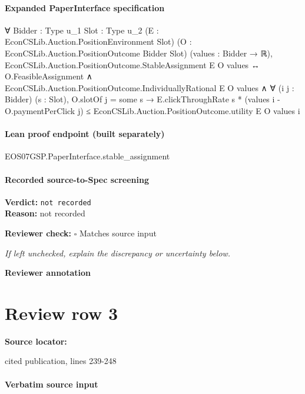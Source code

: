 \documentclass[10pt]{article}
\newcommand{\reviewerbox}{%
  \par\noindent\fbox{\parbox{0.96\linewidth}{\rule{0pt}{0.38in}}}\par
}
\newcommand{\reviewmatch}[1]{%
  \par\noindent\textbf{Reviewer check:} $\square$\; #1\par
  \noindent\emph{If left unchecked, explain the discrepancy or uncertainty below.}\par
}
\begin{document}
\paragraph{Expanded PaperInterface specification}
\begin{ReviewVerbatim}
∀ {Bidder : Type u_1} {Slot : Type u_2} (E : EconCSLib.Auction.PositionEnvironment Slot)
  (O : EconCSLib.Auction.PositionOutcome Bidder Slot) (values : Bidder → ℝ),
  EconCSLib.Auction.PositionOutcome.StableAssignment E O values ↔
    O.FeasibleAssignment ∧
      EconCSLib.Auction.PositionOutcome.IndividuallyRational E O values ∧
        ∀ (i j : Bidder) (s : Slot),
          O.slotOf j = some s →
            E.clickThroughRate s * (values i - O.paymentPerClick j) ≤
              EconCSLib.Auction.PositionOutcome.utility E O values i
\end{ReviewVerbatim}

\paragraph{Lean proof endpoint (built separately)}\begin{ReviewVerbatim}
EOS07GSP.PaperInterface.stable_assignment
\end{ReviewVerbatim}

\paragraph{Recorded source-to-Spec screening}
\textbf{Verdict:} \texttt{not recorded}
\\
\textbf{Reason:} not recorded
\reviewmatch{Matches source input}
\noindent\textbf{Reviewer annotation}\par
\reviewerbox
\clearpage
\hypertarget{source-claim-5f5dbcc78d92e09e}{}
\section*{Review row 3}
\textbf{Source locator:} {\footnotesize\raggedright cited publication, lines 239-\allowbreak{}248\par}
\paragraph{Verbatim source input}
\end{document}
